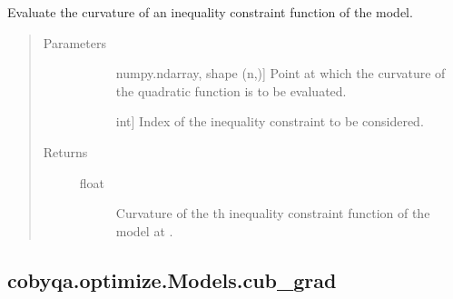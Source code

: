 \documentclass[letterpaper,10pt,english]{sphinxmanual}
\begin{document}
\begin{fulllineitems}
\begin{fulllineitems}
\label{\detokenize{refs/generated/cobyqa.optimize.Models.cub_curv:cobyqa.optimize.Models.cub_curv}}
\sphinxAtStartPar
Evaluate the curvature of an inequality constraint function of the
model.
\begin{quote}\begin{description}
\item[{Parameters}] \leavevmode\begin{description}
\item[{}] \leavevmode{[}numpy.ndarray, shape (n,){]}
\sphinxAtStartPar
Point at which the curvature of the quadratic function is to be
evaluated.

\item[{}] \leavevmode{[}int{]}
\sphinxAtStartPar
Index of the inequality constraint to be considered.

\end{description}

\item[{Returns}] \leavevmode\begin{description}
\item[{float}] \leavevmode
\sphinxAtStartPar
Curvature of the \sphinxhyphen{}th inequality constraint function of the model
at .

\end{description}

\end{description}\end{quote}

\end{fulllineitems}



\subsection{cobyqa.optimize.Models.cub\_grad}
\label{\detokenize{refs/generated/cobyqa.optimize.Models.cub_grad:cobyqa-optimize-models-cub-grad}}\label{\detokenize{refs/generated/cobyqa.optimize.Models.cub_grad::doc}}


\end{fulllineitems}
\end{document}
